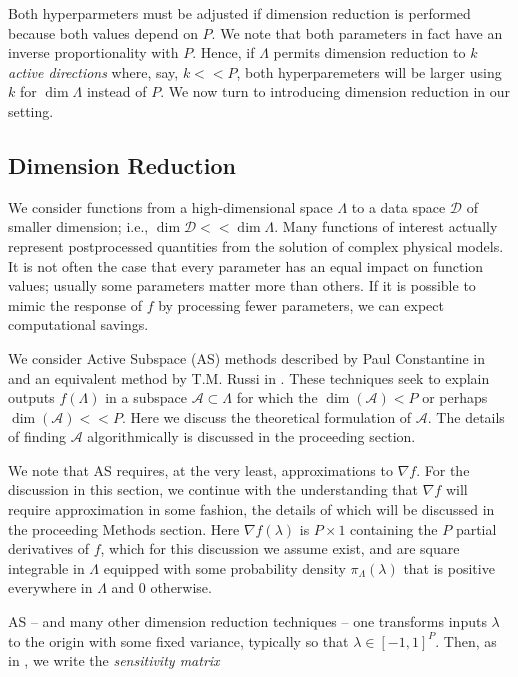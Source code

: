 \documentclass{amsart}
\newcommand{\D}{\mathcal{D}}
\newcommand{\A}{\mathcal{A}}
\begin{document}
Both hyperparmeters must be adjusted if dimension reduction is performed because both values depend on $P$. We note that both parameters in fact have an inverse proportionality with $P$. Hence, if $\Lambda$ permits dimension reduction to $k$ \textit{active directions} where, say, $k<<P$, both hyperparemeters will be larger using $k$ for $\dim \Lambda$ instead of $P.$ We now turn to introducing dimension reduction in our setting.





\subsection{Dimension Reduction}
We consider functions from a high-dimensional space $\Lambda$ to a data space $\D$ of smaller dimension; i.e., $\dim \D << \dim \Lambda$. Many functions of interest
actually represent postprocessed quantities from the solution of complex physical models. 
It is not often the case that every parameter has an equal impact on function values; usually some parameters matter more than others. If it is possible to mimic the response of $f$ by processing fewer parameters, we can expect computational savings.

We consider Active Subspace (AS) methods described by Paul Constantine in \cite{Constantine2015} and an equivalent method by T.M. Russi in \cite{Russi}. These techniques seek to explain outputs $f(\Lambda)$ in a subspace $\A \subset \Lambda$ for which the $\dim (\A) <P$ or perhaps $\dim(\A)<<P$. Here we discuss the theoretical formulation of $\A$. The details of finding $\A$ algorithmically is discussed in the proceeding section.

We note that AS requires, at the very least, approximations to $\nabla f$. For the discussion in this section, we continue with the understanding that $\nabla f$ will require approximation in some fashion, the details of which will be discussed in the proceeding Methods section. Here $\nabla f(\lambda)$ is $P\times 1$ containing the $P$ partial derivatives of $f$, which for this discussion we assume exist, and are square integrable in $\Lambda$ equipped with some probability density $\pi_\Lambda(\lambda)$ that is positive everywhere in $\Lambda$ and 0 otherwise.
 
AS -- and many other dimension reduction techniques \cite{Russi} -- one transforms inputs $\lambda$ to the origin with some fixed variance, typically so that $\lambda\in [-1,1]^P$. Then, as in \cite{ConstantineMC}, we write the \textit{sensitivity matrix}
\end{document}
